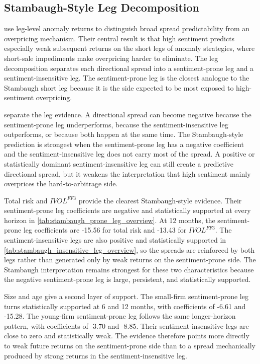 \documentclass[11pt]{article}
\newcommand{\var}[1]{\ensuremath{#1}}
\begin{document}
\subsection{Stambaugh-Style Leg Decomposition}
\citet{stambaugh2012short} use leg-level anomaly returns to distinguish broad spread predictability from an overpricing mechanism. Their central result is that high sentiment predicts especially weak subsequent returns on the short legs of anomaly strategies, where short-sale impediments make overpricing harder to eliminate. The leg decomposition separates each directional spread into a sentiment-prone leg and a sentiment-insensitive leg. The sentiment-prone leg is the closest analogue to the Stambaugh short leg because it is the side expected to be most exposed to high-sentiment overpricing.

 separate the leg evidence. A directional spread can become negative because the sentiment-prone leg underperforms, because the sentiment-insensitive leg outperforms, or because both happen at the same time. The Stambaugh-style prediction is strongest when the sentiment-prone leg has a negative coefficient and the sentiment-insensitive leg does not carry most of the spread. A positive or statistically dominant sentiment-insensitive leg can still create a predictive directional spread, but it weakens the interpretation that high sentiment mainly overprices the hard-to-arbitrage side.

Total risk and \var{IVOL^{FF3}} provide the clearest Stambaugh-style evidence. Their sentiment-prone leg coefficients are negative and statistically supported at every horizon in \cref{tab:stambaugh_prone_leg_overview}. At 12 months, the sentiment-prone leg coefficients are -15.56 for total risk and -13.43 for \var{IVOL^{FF3}}. The sentiment-insensitive legs are also positive and statistically supported in \cref{tab:stambaugh_insensitive_leg_overview}, so the spreads are reinforced by both legs rather than generated only by weak returns on the sentiment-prone side. The Stambaugh interpretation remains strongest for these two characteristics because the negative sentiment-prone leg is large, persistent, and statistically supported.

Size and age give a second layer of support. The small-firm sentiment-prone leg turns statistically supported at 6 and 12 months, with coefficients of -6.61 and -15.28. The young-firm sentiment-prone leg follows the same longer-horizon pattern, with coefficients of -3.70 and -8.85. Their sentiment-insensitive legs are close to zero and statistically weak. The evidence therefore points more directly to weak future returns on the sentiment-prone side than to a spread mechanically produced by strong returns in the sentiment-insensitive leg.
\end{document}
